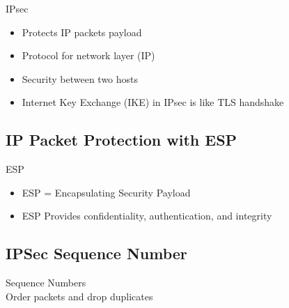 \begin{definition}{IPsec}\\
    \begin{itemize}
        \item Protects IP packets payload
        \item Protocol for network layer (IP)
        \item Security between two hosts
        \item Internet Key Exchange (IKE) in IPsec is like TLS handshake
    \end{itemize}
\end{definition}

\subsection{IP Packet Protection with ESP}

\begin{concept}{ESP}\\
    \begin{itemize}
        \item ESP = Encapsulating Security Payload
        \item ESP Provides confidentiality, authentication, and integrity
    \end{itemize}
\end{concept}


\subsection{IPSec Sequence Number}

\begin{concept}{Sequence Numbers}\\
    Order packets and drop duplicates
\end{concept}